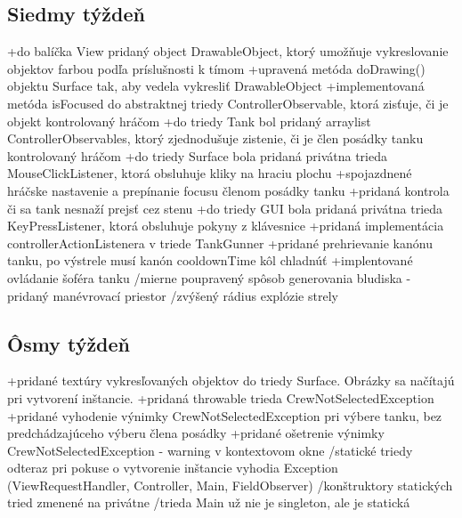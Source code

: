\documentclass[12pt,oneside,slovak,a4paper]{article}
\begin{document}
\subsection{Siedmy týždeň}
+do balíčka View pridaný object DrawableObject, ktorý umožňuje vykreslovanie objektov farbou podľa príslušnosti k tímom\newline
+upravená metóda doDrawing() objektu Surface tak, aby vedela vykresliť DrawableObject\newline
+implementovaná metóda isFocused do abstraktnej triedy ControllerObservable, ktorá zisťuje, či je objekt kontrolovaný hráčom\newline
+do triedy Tank bol pridaný arraylist ControllerObservables, ktorý zjednodušuje zistenie, či je člen posádky tanku kontrolovaný hráčom\newline
+do triedy Surface bola pridaná privátna trieda MouseClickListener, ktorá obsluhuje kliky na hraciu plochu\newline
+spojazdnené hráčske nastavenie a prepínanie focusu členom posádky tanku\newline
+pridaná kontrola či sa tank nesnaží prejsť cez stenu\newline
+do triedy GUI bola pridaná privátna trieda KeyPressListener, ktorá obsluhuje pokyny z klávesnice\newline
+pridaná implementácia controllerActionListenera v triede TankGunner\newline
+pridané prehrievanie kanónu tanku, po výstrele musí kanón cooldownTime kôl chladnúť\newline
+implentované ovládanie šoféra tanku\newline
\newline
/mierne poupravený spôsob generovania bludiska - pridaný manévrovací priestor\newline
/zvýšený rádius explózie strely\newline
\subsection{Ôsmy týždeň}
+pridané textúry vykresľovaných objektov do triedy Surface. Obrázky sa načítajú pri vytvorení inštancie.\newline
+pridaná throwable trieda CrewNotSelectedException\newline
+pridané vyhodenie výnimky CrewNotSelectedException pri výbere tanku, bez predchádzajúceho výberu člena posádky\newline
+pridané ošetrenie výnimky CrewNotSelectedException - warning v kontextovom okne\newline
\newline
/statické triedy odteraz pri pokuse o vytvorenie inštancie vyhodia Exception (ViewRequestHandler, Controller, Main, FieldObserver)\newline
/konštruktory statických tried zmenené na privátne\newline
/trieda Main už nie je singleton, ale je statická\newline
\end{document}
